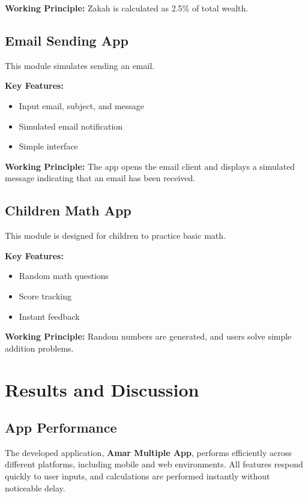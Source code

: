 \documentclass{article}
\begin{document}
\textbf{Working Principle:}
Zakah is calculated as 2.5\% of total wealth.

\subsection{Email Sending App}

This module simulates sending an email.

\textbf{Key Features:}
\begin{itemize}
\item Input email, subject, and message
\item Simulated email notification
\item Simple interface
\end{itemize}

\textbf{Working Principle:}
The app opens the email client and displays a simulated message indicating that an email has been received.

\subsection{Children Math App}

This module is designed for children to practice basic math.

\textbf{Key Features:}
\begin{itemize}
\item Random math questions
\item Score tracking
\item Instant feedback
\end{itemize}

\textbf{Working Principle:}
Random numbers are generated, and users solve simple addition problems.


\section{Results and Discussion}

\subsection{App Performance}

The developed application, \textbf{Amar Multiple App}, performs efficiently across different platforms, including mobile and web environments. All features respond quickly to user inputs, and calculations are performed instantly without noticeable delay.
\end{document}
